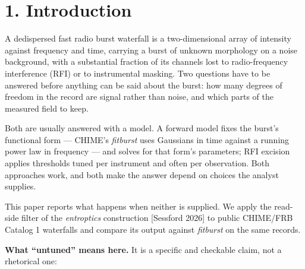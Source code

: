 \documentclass[10pt,letterpaper,twocolumn]{article}
\begin{document}
\ifdim\dimexpr\ht\typesetfront+\dp\typesetfront+10\baselineskip\relax<\textheight
  \twocolumn[\unvbox\typesetfront]
\else
  \twocolumn[\unvbox\typesettitle\typesetrule]
  {\centering\small\bfseries Abstract\par}\vspace{0.6ex}
  {\small\setlength{\parskip}{0.5ex}\noindent\typesetabstract\par}
  \typesetrule
\fi
\makeatother

\section{1. Introduction}\label{1-introduction}

A dedispersed fast radio burst waterfall is a two-dimensional array of intensity against frequency and time, carrying a burst of unknown morphology on a noise background, with a substantial fraction of its channels lost to radio-frequency interference (RFI) or to instrumental masking. Two questions have to be answered before anything can be said about the burst: how many degrees of freedom in the record are signal rather than noise, and which parts of the measured field to keep.

Both are usually answered with a model. A forward model fixes the burst's functional form --- CHIME's \emph{fitburst} uses Gaussians in time against a running power law in frequency --- and solves for that form's parameters; RFI excision applies thresholds tuned per instrument and often per observation. Both approaches work, and both make the answer depend on choices the analyst supplies.

This paper reports what happens when neither is supplied. We apply the read-side filter of the \emph{entroptics} construction {[}Sessford 2026{]} to public CHIME/FRB Catalog 1 waterfalls and compare its output against \emph{fitburst} on the same records.

\textbf{What ``untuned'' means here.} It is a specific and checkable claim, not a rhetorical one:
\end{document}
